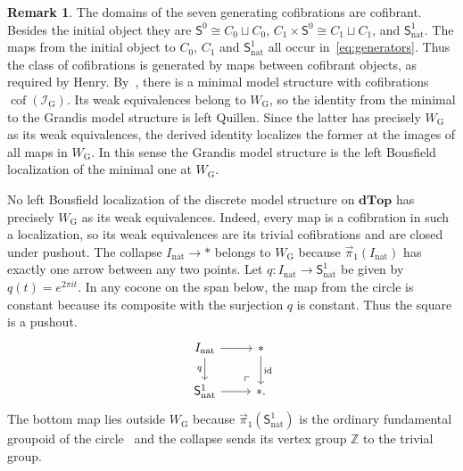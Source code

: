 \documentclass[12pt,a4paper]{amsart}
\theoremstyle{definition}
\newtheorem{remark}[theorem]{Remark}
\renewcommand{\vec}{\overrightarrow}
\newcommand{\D}{\mathbf{dTop}}
\newcommand{\I}{\mathcal I_{\mathrm G}}
\newcommand{\WG}{W_{\mathrm G}}
\newcommand{\rev}[1]{#1_{\mathrm{nat}}}
\newcommand{\Iv}{\rev{I}}
\newcommand{\cube}[1]{C_{#1}}
\newcommand{\PiC}{\vec{\pi}_1}
\begin{document}
\begin{remark}
The domains of the seven generating cofibrations are cofibrant. Besides the initial object they are $\mathsf{S}^0\cong\cube 0\sqcup\cube 0$, $\cube 1\times\mathsf{S}^0\cong\cube 1\sqcup\cube 1$, and $\rev{\mathsf{S}^1}$. The maps from the initial object to $\cube 0$, $\cube 1$ and $\rev{\mathsf{S}^1}$ all occur in~\eqref{eq:generators}. Thus the class of cofibrations is generated by maps between cofibrant objects, as required by Henry. By~\cite[Definition~1.2, Theorem~1.4 and Example~1.7]{henry2020minimal}, there is a minimal model structure with cofibrations $\operatorname{cof}(\I)$. Its weak equivalences belong to $\WG$, so the identity from the minimal to the Grandis model structure is left Quillen. Since the latter has precisely $\WG$ as its weak equivalences, the derived identity localizes the former at the images of all maps in $\WG$. In this sense the Grandis model structure is the left Bousfield localization of the minimal one at $\WG$.

No left Bousfield localization of the discrete model structure on $\D$ has precisely $\WG$ as its weak equivalences. Indeed, every map is a cofibration in such a localization, so its weak equivalences are its trivial cofibrations and are closed under pushout. The collapse $\Iv\to *$ belongs to $\WG$ because $\PiC(\Iv)$ has exactly one arrow between any two points. Let $q\colon\Iv\to\rev{\mathsf{S}^1}$ be given by $q(t)=e^{2\pi it}$. In any cocone on the span below, the map from the circle is constant because its composite with the surjection $q$ is constant. Thus the square is a pushout.
\[
\begin{tikzcd}
 \Iv\ar[r]\ar[d,"q"'] & *\ar[d,"\mathrm{id}"]\\
 \rev{\mathsf{S}^1}\ar[r] & *\ar[ul,phantom,"\ulcorner",very near start].
\end{tikzcd}
\]
The bottom map lies outside $\WG$ because $\PiC(\rev{\mathsf{S}^1})$ is the ordinary fundamental groupoid of the circle~\cite[Section~3.1]{mg} and the collapse sends its vertex group $\mathbb Z$ to the trivial group.
\end{remark}
\end{document}
